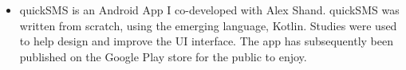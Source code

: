\documentclass[8pt,a4paper]{altacv}
\begin{document}
\begin{itemize}
\item quickSMS is an Android App I co-developed with Alex Shand. quickSMS was written from scratch, using the emerging language, Kotlin. Studies were used to help design and improve the UI interface. The app has subsequently been published on the Google Play store for the public to enjoy.
\end{itemize}
\divider
\end{document}
